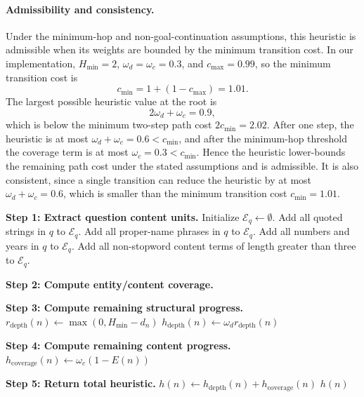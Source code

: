 \documentclass[10pt]{article}
\begin{document}
\paragraph{Admissibility and consistency.}
Under the minimum-hop and non-goal-continuation assumptions, this
heuristic is admissible when its weights are bounded by the minimum
transition cost. In our implementation, \(H_{\min}=2\),
\(\omega_d=\omega_c=0.3\), and \(c_{\max}=0.99\), so the minimum
transition cost is
\[
c_{\min}=1+(1-c_{\max})=1.01.
\]
The largest possible heuristic value at the root is
\[
2\omega_d+\omega_c=0.9,
\]
which is below the minimum two-step path cost \(2c_{\min}=2.02\). After
one step, the heuristic is at most \(\omega_d+\omega_c=0.6<c_{\min}\),
and after the minimum-hop threshold the coverage term is at most
\(\omega_c=0.3<c_{\min}\). Hence the heuristic lower-bounds the remaining
path cost under the stated assumptions and is admissible. It is also
consistent, since a single transition can reduce the heuristic by at most
\(\omega_d+\omega_c=0.6\), which is smaller than the minimum transition
cost \(c_{\min}=1.01\).

\begin{algorithm}[t]
\caption{Dataset-Agnostic Symbolic Progress Heuristic}
\label{alg:symbolic-progress-heuristic}

\BlankLine
\textbf{Step 1: Extract question content units.}\;
Initialize \(\mathcal{E}_q \leftarrow \emptyset\).\;
Add all quoted strings in \(q\) to \(\mathcal{E}_q\).\;
Add all proper-name phrases in \(q\) to \(\mathcal{E}_q\).\;
Add all numbers and years in \(q\) to \(\mathcal{E}_q\).\;
Add all non-stopword content terms of length greater than three to \(\mathcal{E}_q\).\;

\BlankLine
\textbf{Step 2: Compute entity/content coverage.}\;

\BlankLine
\textbf{Step 3: Compute remaining structural progress.}\;
\(r_{\mathrm{depth}}(n) \leftarrow \max(0,H_{\min}-d_n)\)\;
\(h_{\mathrm{depth}}(n) \leftarrow \omega_d r_{\mathrm{depth}}(n)\)\;

\BlankLine
\textbf{Step 4: Compute remaining content progress.}\;
\(h_{\mathrm{coverage}}(n) \leftarrow \omega_c(1-E(n))\)\;

\BlankLine
\textbf{Step 5: Return total heuristic.}\;
\(h(n) \leftarrow h_{\mathrm{depth}}(n)+h_{\mathrm{coverage}}(n)\)\;
\Return \(h(n)\)\;
\end{algorithm}
\end{document}
